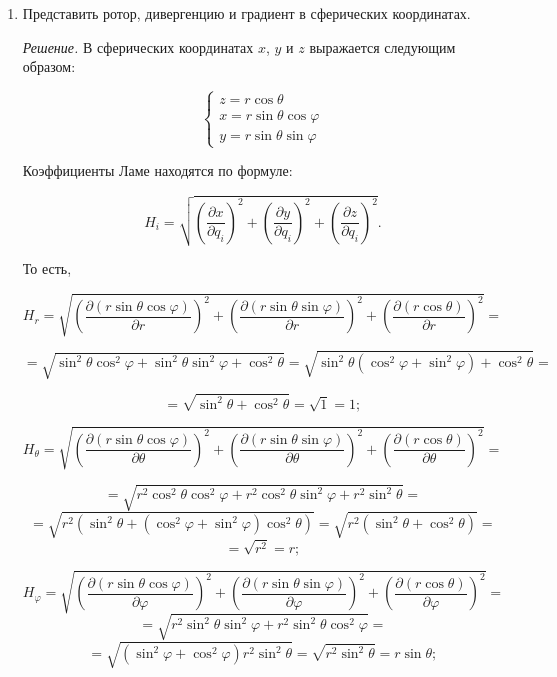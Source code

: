 \documentclass{article}
\begin{document}
\begin{enumerate}
  \item{
Представить ротор, дивергенцию и градиент в сферических координатах.

\textit{Решение.} В сферических координатах $x$, $y$ и $z$ выражается следующим образом:

$$
\left\{
\begin{array}{c}
  z = r \cos{\theta} \\
  x = r \sin{\theta} \cos{\varphi} \\
  y = r \sin{\theta} \sin{\varphi}
\end{array}
\right.
$$

Коэффициенты Ламе находятся по формуле:

$$H_i = \sqrt{ \left(\dfrac {\partial x} {\partial q_i} \right)^2 + \left(\dfrac {\partial y} {\partial q_i} \right)^2 + \left(\dfrac {\partial z} {\partial q_i} \right)^2}.$$

То есть,

$$H_r = \sqrt{ \left(\dfrac {\partial (r \sin{\theta} \cos{\varphi})} {\partial r} \right)^2 + \left(\dfrac {\partial (r \sin{\theta} \sin{\varphi})} {\partial r} \right)^2 + \left(\dfrac {\partial (r \cos{\theta})} {\partial r} \right)^2} =$$

$$= \sqrt{\sin^2 {\theta} \cos^2 {\varphi} + \sin^2{\theta} \sin^2{\varphi} + \cos^2{\theta}} = \sqrt{\sin^2{\theta}(\cos^2{\varphi} + \sin^2{\varphi}) + \cos^2{\theta}} =$$

$$= \sqrt{\sin^2{\theta} + \cos^2{\theta}} = \sqrt{1} = 1;$$

$$H_\theta = \sqrt{ \left(\dfrac {\partial (r \sin{\theta} \cos{\varphi})} {\partial \theta} \right)^2 + \left(\dfrac {\partial (r \sin{\theta} \sin{\varphi})} {\partial \theta} \right)^2 + \left(\dfrac {\partial (r \cos{\theta})} {\partial \theta} \right)^2} =$$

$$= \sqrt{r^2 \cos^2{\theta} \cos^2{\varphi} + r^2 \cos^2{\theta} \sin^2{\varphi} + r^2 \sin^2{\theta}} =$$
$$=\sqrt{r^2(\sin^2{\theta} + (\cos^2{\varphi} + \sin^2{\varphi}) \cos^2{\theta} )} = \sqrt{r^2(\sin^2{\theta} + \cos^2{\theta})} =$$
$$=\sqrt{r^2} = r;$$

$$H_\varphi = \sqrt{ \left(\dfrac {\partial (r \sin{\theta} \cos{\varphi})} {\partial \varphi} \right)^2 + \left(\dfrac {\partial (r \sin{\theta} \sin{\varphi})} {\partial \varphi} \right)^2 + \left(\dfrac {\partial (r \cos{\theta})} {\partial \varphi} \right)^2} =$$
$$= \sqrt{r^2 \sin^2{\theta} \sin^2{\varphi} + r^2 \sin^2{\theta} \cos^2{\varphi}}=$$
$$=\sqrt{(\sin^2{\varphi} + \cos^2{\varphi})r^2 \sin^2{\theta}} = \sqrt{r^2 \sin^2{\theta}} = r \sin{\theta};$$

}
\end{enumerate}
\end{document}
